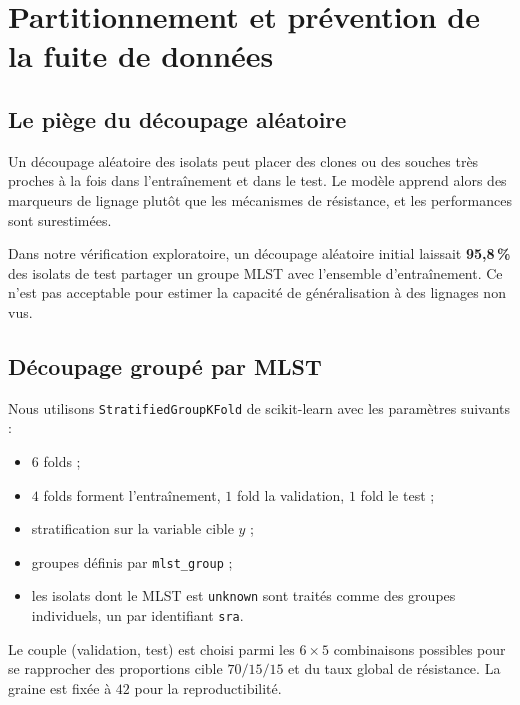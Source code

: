 \documentclass[11pt,a4paper]{article}
\begin{document}
\section{Partitionnement et prévention de la fuite de données}
\label{sec:splits}

\subsection{Le piège du découpage aléatoire}

Un découpage aléatoire des isolats peut placer des clones ou des souches très proches à la fois dans l'entraînement et dans le test. Le modèle apprend alors des marqueurs de lignage plutôt que les mécanismes de résistance, et les performances sont surestimées.

Dans notre vérification exploratoire, un découpage aléatoire initial laissait \textbf{95,8\,\%} des isolats de test partager un groupe MLST avec l'ensemble d'entraînement. Ce n'est pas acceptable pour estimer la capacité de généralisation à des lignages non vus.

\subsection{Découpage groupé par MLST}

Nous utilisons \texttt{StratifiedGroupKFold} de scikit-learn \citep{pedregosa2011} avec les paramètres suivants :
\begin{itemize}[leftmargin=1.2em]
    \item $6$ folds ;
    \item $4$ folds forment l'entraînement, $1$ fold la validation, $1$ fold le test ;
    \item stratification sur la variable cible $y$ ;
    \item groupes définis par \texttt{mlst\_group} ;
    \item les isolats dont le MLST est \texttt{unknown} sont traités comme des groupes individuels, un par identifiant \texttt{sra}.
\end{itemize}

Le couple (validation, test) est choisi parmi les $6 \times 5$ combinaisons possibles pour se rapprocher des proportions cible $70/15/15$ et du taux global de résistance. La graine est fixée à $42$ pour la reproductibilité.
\end{document}
